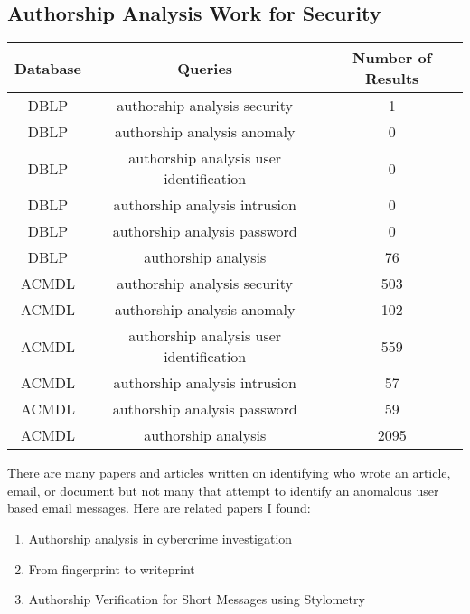 \documentclass[]{article}
\begin{document}
\subsection*{Authorship Analysis Work for Security}
\begin{table}[!htb]
\centering
        \begin{tabular}{|c|c|c|}
        \hline
         Database & Queries & Number of Results \\
         \hline
         DBLP & authorship analysis security & 1\\
         DBLP & authorship analysis anomaly & 0\\
         DBLP & authorship analysis user identification  & 0\\
         DBLP & authorship analysis intrusion & 0\\
         DBLP & authorship analysis password & 0\\
         DBLP & authorship analysis & 76\\
         ACMDL & authorship analysis security & 503\\
		 ACMDL & authorship analysis anomaly & 102\\
	 	 ACMDL & authorship analysis user identification  & 559\\
		 ACMDL & authorship analysis intrusion  & 57\\
		 ACMDL & authorship analysis password & 59\\
		 ACMDL & authorship analysis & 2095\\
        \hline
        \end{tabular}
\end{table}

There are many papers and articles written on identifying who wrote an article, email, or document but not many that attempt to identify an anomalous user based email messages. Here are related papers I found:

\begin{enumerate}
\item{Authorship analysis in cybercrime investigation}
\item{From fingerprint to writeprint}
\item{Authorship Verification for Short Messages using
Stylometry}
\end{enumerate}
\end{document}

